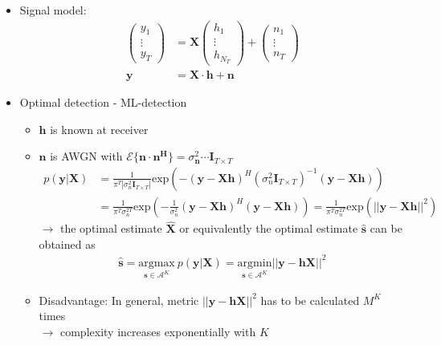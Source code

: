 \documentclass[a4paper, 10pt]{article}
\begin{document}
\begin{itemize}
	\item Signal model:
	\begin{align*}
	\begin{pmatrix} y_1 \\ \vdots \\ y_T \end{pmatrix}&=\mathbf{X}\begin{pmatrix} h_1 \\ \vdots \\ h_{N_T} \end{pmatrix} + \begin{pmatrix} n_1 \\ \vdots \\ n_T \end{pmatrix}\\
	\mathbf{y}&=\mathbf{X}\cdot\mathbf{h}+\mathbf{n}
	\end{align*}
	\item Optimal detection - ML-detection
	\begin{itemize}
		\item $\mathbf{h}$ is known at receiver
		\item $\mathbf{n}$ is AWGN with $\mathcal{E}\{\mathbf{n}\cdot\mathbf{n^H}\}=\sigma_{\mathbf{n}}^2\cdots \mathbf{I}_{T\times T}$
		\begin{align*}
		p(\mathbf{y}|\mathbf{X}) 
		&=\frac{1}{\pi^T|\sigma_n^2\mathbf{I}_{T\times T}|}\mathrm{exp}\left(-(\mathbf{y - Xh})^H(\sigma_n^2\mathbf{I}_{T\times T})^{-1}(\mathbf{y-Xh})\right)\\
		&=\frac{1}{\pi^T\sigma_n^{2T}}\mathrm{exp}\left(-\frac{1}{\sigma_n^2}(\mathbf{y-Xh})^H(\mathbf{y-Xh})\right)=\frac{1}{\pi^T\sigma_n^{2T}}\mathrm{exp}\left(||\mathbf{y-Xh}||^2\right)
		\end{align*}
		$\rightarrow$ the optimal estimate $\hat{\mathbf{X}}$ or equivalently the optimal estimate $\hat{\mathbf{s}}$ can be obtained as
		\begin{align*}
			\hat{\mathbf{s}}=\underset{\mathbf{s}\in\mathcal{A}^K}{\mathrm{argmax}}\ p(\mathbf{y|X})=\underset{\mathbf{s}\in\mathcal{A}^K}{\mathrm{argmin}}||\mathbf{y-hX}||^2
		\end{align*}
		\item Disadvantage: In general, metric $||\mathbf{y-hX}||^2$ has to be calculated $M^K$ times\\
		$\rightarrow$ complexity increases exponentially with $K$
	\end{itemize}
\end{itemize}
\end{document}
